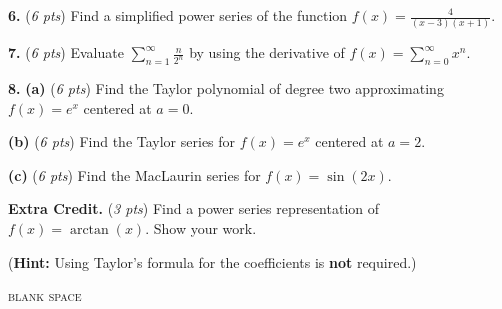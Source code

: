 \documentclass[12pt]{article}
\renewcommand{\emph}[1]{\textsf{\textbf{#1}}}
\let\ds\displaystyle
\newcommand{\prob}[1]{\bigskip\noindent\textbf{#1.} }
\newcommand{\pts}[1]{{\small (\textsl{#1 pts})}}
\newcommand{\probpts}[2]{\prob{#1} \pts{#2} \quad}
\newcommand{\epartpts}[2]{\medskip\noindent \textbf{(#1)} \pts{#2} \quad}
\begin{document}
\newpage\clearpage

\probpts{6}{6} Find a simplified power series of the function $\ds f(x)=\frac{4}{(x-3)(x+1)}$.
\vfill 

\probpts{7}{6} Evaluate $\ds\sum_{n=1}^\infty \frac{n}{2^n}$ by using the derivative of $\ds f(x)=\sum_{n=0}^\infty x^n$.
\vfill


\newpage\clearpage

\prob{8} 
\epartpts{a}{6}
Find the Taylor polynomial of degree two approximating $f(x)=e^x$ centered at $a=0$.
\vfill

\epartpts{b}{6}
Find the Taylor series for $f(x)=e^x$ centered at $a=2$.

\vfill

\newpage\clearpage


\epartpts{c}{6} Find the MacLaurin series for $f(x)=\sin(2x)$.
\vfill
\vfill\vfill\vfill

\probpts{Extra Credit}{3} Find a power series representation of $f(x)=\arctan(x)$. Show your work.

(\emph{Hint:} Using Taylor's formula for the coefficients is \emph{not} required.)
\vfill
\vfill
\vfill 

\newpage\clearpage
\medskip
\centerline{\footnotesize \textsc{blank space}}
\vfill
\end{document}
